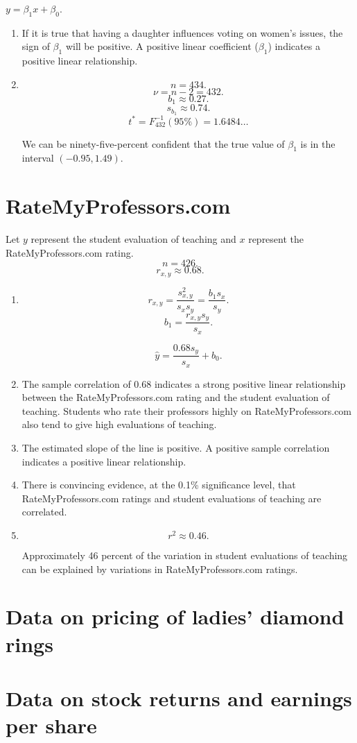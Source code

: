 \documentclass[12pt]{article}
\begin{document}
$y=\beta_1x+\beta_0.$

\begin{enumerate}
\item If it is true that having a daughter influences voting on women's issues, the sign of $\beta_1$ will be positive. A positive linear coefficient ($\beta_1$) indicates a positive linear relationship.
\item
\[n=434.\]
\[\nu=n-2=432.\]
\[b_1\approx 0.27.\]
\[s_{b_1}\approx 0.74.\]
\[t^*=F^{-1}_{432}(95\%)=1.6484\dots\]

We can be ninety-five-percent confident that the true value of $\beta_1$ is in the interval $(-0.95,1.49)$.
\end{enumerate}
\section{RateMyProfessors.com}
Let $y$ represent the student evaluation of teaching and $x$ represent the RateMyProfessors.com rating.
\[n=426.\]
\[r_{x,y}\approx 0.68.\]
\begin{enumerate}
\item
\[r_{x,y}=\frac{s^2_{x,y}}{s_xs_y}=\frac{b_1s_x}{s_y}.\]
\[b_1=\frac{r_{x,y}s_y}{s_x}.\]

\[\hat{y}=\frac{0.68s_y}{s_x}+b_0.\]
\item The sample correlation of 0.68 indicates a strong positive linear relationship between the RateMyProfessors.com rating and the student evaluation of teaching. Students who rate their professors highly on RateMyProfessors.com also tend to give high evaluations of teaching.
\item The estimated slope of the line is positive. A positive sample correlation indicates a positive linear relationship.
\item There is convincing evidence, at the 0.1\% significance level, that RateMyProfessors.com ratings and student evaluations of teaching are correlated.
\item\[r^2\approx 0.46.\]

Approximately 46 percent of the variation in student evaluations of teaching can be explained by variations in RateMyProfessors.com ratings.
\end{enumerate}
\section{Data on pricing of ladies' diamond rings}
\section{Data on stock returns and earnings per share}
\end{document}
